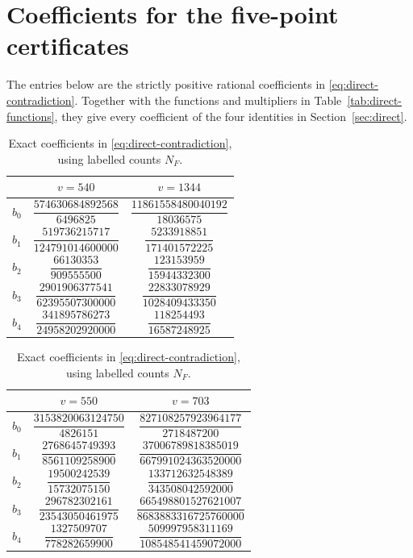 \documentclass[11pt]{article}
\theoremstyle{remark}
\numberwithin{equation}{section}
\begin{document}
\section{Coefficients for the five-point certificates}\label{app:five-coefficients}
The entries below are the strictly positive rational coefficients in
\eqref{eq:direct-contradiction}. Together with the functions and multipliers
in Table~\ref{tab:direct-functions}, they give every coefficient of the
four identities in Section~\ref{sec:direct}.
\begin{table}[H]\centering\small
\caption{Exact coefficients in \eqref{eq:direct-contradiction}, using labelled counts $N_F$.}
\label{tab:direct-coeff-a}
\renewcommand{\arraystretch}{1.8}
\begin{tabular}{ccc}\toprule
&$v=540$&$v=1344$\\\midrule
$b_0$&$\dfrac{574630684892568}{6496825}$&$\dfrac{11861558480040192}{18036575}$\\
$b_1$&$\dfrac{519736215717}{124791014600000}$&$\dfrac{5233918851}{171401572225}$\\
$b_2$&$\dfrac{66130353}{909555500}$&$\dfrac{123153959}{15944332300}$\\
$b_3$&$\dfrac{2901906377541}{62395507300000}$&$\dfrac{22833078929}{1028409433350}$\\
$b_4$&$\dfrac{341895786273}{24958202920000}$&$\dfrac{118254493}{16587248925}$\\
\bottomrule\end{tabular}\end{table}
\begin{table}[H]\centering\small
\caption{Exact coefficients in \eqref{eq:direct-contradiction}, using labelled counts $N_F$.}
\label{tab:direct-coeff-b}
\renewcommand{\arraystretch}{1.8}
\begin{tabular}{ccc}\toprule
&$v=550$&$v=703$\\\midrule
$b_0$&$\dfrac{3153820063124750}{4826151}$&$\dfrac{827108257923964177}{2718487200}$\\
$b_1$&$\dfrac{2768645749393}{8561109258900}$&$\dfrac{37006789818385019}{667991024363520000}$\\
$b_2$&$\dfrac{19500242539}{15732075150}$&$\dfrac{133712632548389}{343508042592000}$\\
$b_3$&$\dfrac{296782302161}{23543050461975}$&$\dfrac{665498801527621007}{8683883316725760000}$\\
$b_4$&$\dfrac{1327509707}{778282659900}$&$\dfrac{509997958311169}{108548541459072000}$\\
\bottomrule\end{tabular}\end{table}
\end{document}
